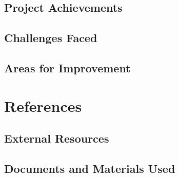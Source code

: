 \documentclass{report}
\begin{document}
\section{Project Achievements}
\section{Challenges Faced}
\section{Areas for Improvement}

\chapter{References}
\section{External Resources}
\section{Documents and Materials Used}
\end{document}

